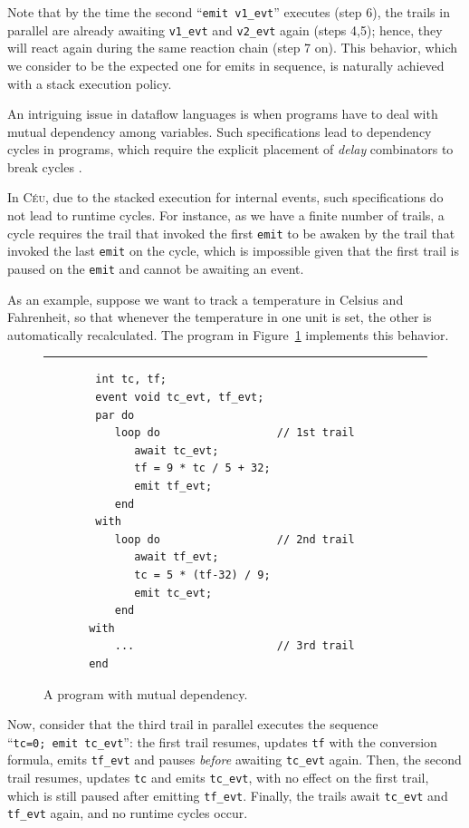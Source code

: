 \documentclass[11pt,a4paper]{article}
\newcommand{\2}{\;\;}
\newcommand{\5}{\;\;\;\;\;}
\newcommand{\CEU}{\textsc{C\'{e}u}}
\newcommand{\code}[1] {{\small{\texttt{#1}}}}
\begin{document}
Note that by the time the second ``\code{emit v1\_evt}'' executes (step 6), the 
trails in parallel are already awaiting \code{v1\_evt} and \code{v2\_evt} again 
(steps 4,5); hence, they will react again during the same reaction chain (step 
7 on).
This behavior, which we consider to be the expected one for emits in sequence, 
is naturally achieved with a stack execution policy.

An intriguing issue in dataflow languages is when programs have to deal with 
mutual dependency among variables.
Such specifications lead to dependency cycles in programs, which require the
explicit placement of \emph{delay} combinators to break cycles
\cite{frtime.embedding}.

In \CEU, due to the stacked execution for internal events, such specifications 
do not lead to runtime cycles.
For instance, as we have a finite number of trails, a cycle requires the trail 
that invoked the first \code{emit} to be awaken by the trail that invoked the 
last \code{emit} on the cycle, which is impossible given that the first trail 
is paused on the \code{emit} and cannot be awaiting an event.

As an example, suppose we want to track a temperature in Celsius and 
Fahrenheit, so that whenever the temperature in one unit is set, the other is 
automatically recalculated.
The program in Figure~\ref{lst:ceu:frp:2} implements this behavior.

\begin{figure}[h]
\rule{15cm}{0.37pt}
{\small
\begin{verbatim}
        int tc, tf;
        event void tc_evt, tf_evt;
        par do
           loop do                  // 1st trail
              await tc_evt;
              tf = 9 * tc / 5 + 32;
              emit tf_evt;
           end
        with
           loop do                  // 2nd trail
              await tf_evt;
              tc = 5 * (tf-32) / 9;
              emit tc_evt;
           end
       with
           ...                      // 3rd trail
       end
\end{verbatim}
}
\caption{ A program with mutual dependency.
\label{lst:ceu:frp:2}
}
\end{figure}

Now, consider that the third trail in parallel executes the sequence 
``\code{tc=0;~emit~tc\_evt}'': the first trail resumes, updates \code{tf} with 
the conversion formula, emits \code{tf\_evt} and pauses \emph{before} awaiting 
\code{tc\_evt} again.
Then, the second trail resumes, updates \code{tc} and emits \code{tc\_evt}, 
with no effect on the first trail, which is still paused after emitting 
\code{tf\_evt}.
Finally, the trails await \code{tc\_evt} and \code{tf\_evt} again, and no 
runtime cycles occur.
\end{document}
